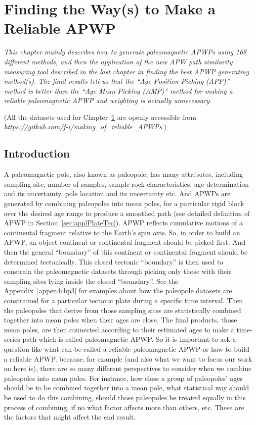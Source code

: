 \chapter{Finding the Way(s) to Make a Reliable APWP}\label{chap:Reliab}  %
\textit{This chapter mainly describes how to generate paleomagnetic APWPs using
168 different methods, and then the application of the new APW path similarity
measuring tool described in the last chapter in finding the best APWP generating
method(s). The final results tell us that the ``Age Position Picking (APP)''  %
method is better than the ``Age Mean Picking (AMP)'' method for making a
reliable paleomagnetic APWP and weighting is actually unnecessary.}
\vfill
\minitoc\newpage

(All the datasets used for Chapter~\ref{chap:Reliab} are openly accessible from
\emph{https://github.com/f-i/making\_of\_reliable\_APWPs}.)

\section{Introduction}

A paleomagnetic pole, also known as paleopole, has many attributes, including
sampling site, number of samples, sample rock characteristics, age determination
and its uncertainty, pole location and its uncertainty etc. And APWPs are
generated by combining paleopoles into mean poles, for a particular rigid block
over the desired age range to produce a smoothed path (see detailed definition
of APWP in Section~\ref{sec:applPlateTec}). APWP reflects cumulative motions of
a continental fragment relative to the Earth's spin axis. So, in order to build
an APWP, an object continent or continental fragment should be picked first. And
then the general ``boundary'' of this continent or continental fragment should
be determined tectonically. This closed tectonic ``boundary'' is then used to
constrain the paleomagnetic datasets through picking only those with their
sampling sites lying inside the closed ``boundary''. See the
Appendix~\ref{appen4chp3}
for examples about how the paleopole datasets are constrained for a particular
tectonic plate during a specific time interval. Then the paleopoles that derive
from those sampling sites are statistically combined together into mean poles
when their ages are close. The final products, those mean poles, are then
connected according to their estimated ages to make a time-series path which is
called paleomagnetic APWP\@. So it is important to ask a question like what can
be called a reliable paleomagnetic APWP or how to build a reliable APWP,
because, for example (and also what we want to focus our work on here is), there
are so many different perspectives to consider when we combine paleopoles into
mean poles. For instance, how close a group of paleopoles' ages should be to be
combined together into a mean pole, what statistical way should be used to do
this combining, should those paleopoles be treated equally in this process of
combining, if no what factor affects more than others, etc. These are the
factors that might affect the end result.

